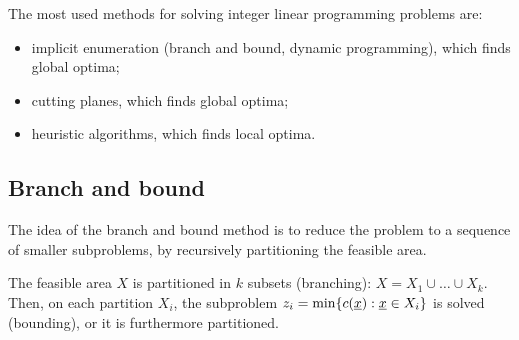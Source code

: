 The most used methods for solving integer linear programming problems are:

\begin{itemize}
    \item implicit enumeration (branch and bound, dynamic programming), which finds global optima;
    \item cutting planes, which finds global optima;
    \item heuristic algorithms, which finds local optima.
\end{itemize}

\subsection{Branch and bound}

The idea of the branch and bound method is to reduce the problem to a sequence of smaller subproblems, by recursively partitioning the feasible area.

The feasible area $X$ is partitioned in $k$ subsets (branching): $X = X_1 \cup \dots \cup X_k$.
Then, on each partition $X_i$, the subproblem $z_i = \min \{ c(\underline{x}) : \underline{x} \in X_i \}$ is solved (bounding), or it is furthermore partitioned.

